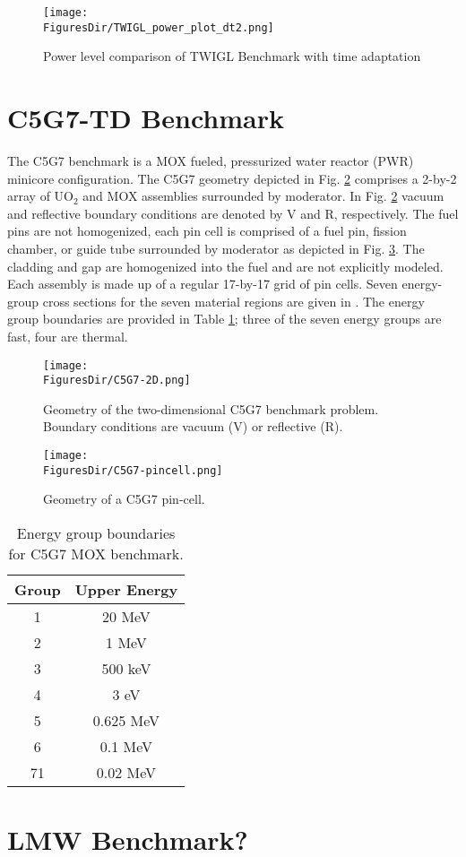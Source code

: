 \begin{figure}[!htbp]
\centering
\texttt{[image: \\FiguresDir/TWIGL\_power\_plot\_dt2.png]}
\caption{Power level comparison of TWIGL Benchmark with time adaptation}
\label{fig:TWIGL_power_dt2}
\end{figure}

\pagebreak
\section{C5G7-TD Benchmark}

The C5G7 benchmark is a MOX fueled, pressurized water reactor (PWR) minicore configuration. The C5G7 geometry depicted in Fig. \ref{fig:c5g7-2D} comprises a 2-by-2 array of UO$_2$ and MOX assemblies surrounded by moderator. In Fig. \ref{fig:c5g7-2D} vacuum and reflective boundary conditions are denoted by V and R, respectively. The fuel pins are not homogenized, each pin cell is comprised of a fuel pin, fission chamber, or guide tube surrounded by moderator as depicted in Fig. \ref{fig:c5g7-pincell}. The cladding and gap are homogenized into the fuel and are not explicitly modeled. Each assembly is made up of a regular 17-by-17 grid of pin cells.
Seven energy-group cross sections for the seven material regions are given in \cite{c5g7}. The energy group boundaries are provided in Table \ref{tab:c5g7-ebounds}; three of the seven energy groups are fast, four are thermal.

\begin{figure}[!htpb]
\begin{center}
\texttt{[image: \\FiguresDir/C5G7-2D.png]}
\end{center}
\caption{Geometry of the two-dimensional C5G7 benchmark problem. Boundary conditions are vacuum (V) or reflective (R).}
\label{fig:c5g7-2D}
\end{figure}

\begin{figure}[!htpb]
\begin{center}
\texttt{[image: \\FiguresDir/C5G7-pincell.png]}
\end{center}
\caption{Geometry of a C5G7 pin-cell.}
\label{fig:c5g7-pincell}
\end{figure}

\begin{table}[!htpb]
\centering
\caption{Energy group boundaries for C5G7 MOX benchmark.}
\label{tab:c5g7-ebounds}
\begin{tabular}{c c}
\hline
Group & Upper Energy\\
\hline
 1&20 MeV  \\
 2&1 MeV  \\
 3&500 keV  \\
 4&3 eV  \\
 5&0.625 MeV  \\
 6&0.1 MeV  \\
71&0.02 MeV  \\
\hline
\end{tabular}
\end{table}

\pagebreak
\section{LMW Benchmark?}

